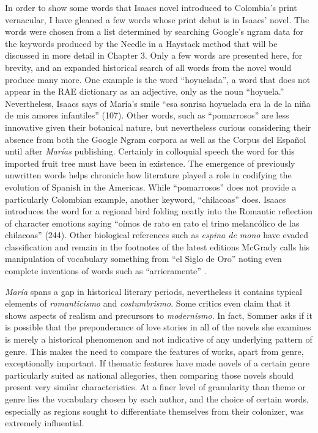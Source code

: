 \documentclass[12pt]{report}
\begin{document}
In order to show some words that Isaacs novel introduced to Colombia's print vernacular, I have gleaned a few words whose print debut is in Isaacs’ novel.
The words were chosen from a list determined by searching Google's ngram data for the keywords produced by the Needle in a Haystack method that will be discussed in more detail in Chapter 3.
Only a few words are presented here, for brevity, and an expanded historical search of all words from the novel would produce many more.
One example is the word \enquote{hoyuelada}, a word that does not appear in the RAE dictionary as an adjective, only as the noun \enquote{hoyuela.}
Nevertheless, Isaacs says of María’s smile \enquote{esa sonrisa hoyuelada era la de la niña de mis amores infantiles} (107).
Other words, such as \enquote{pomarrosos} are less innovative given their botanical nature, but nevertheless curious considering their absence from both the Google Ngram corpora as well as the Corpus del Español until after \textit{Marías} publishing.
Certainly in colloquial speech the word for this imported fruit tree must have been in existence.
The emergence of previously unwritten words helps chronicle how literature played a role in codifying the evolution of Spanish in the Americas.
While \enquote{pomarrosos} does not provide a particularly Colombian example, another keyword, \enquote{chilacoas} does.
Isaacs introduces the word for a regional bird folding neatly into the Romantic reflection of character emotions saying \enquote{oímos de rato en rato el trino melancólico de las chilacoas} (244).
Other biological references such as \textit{espina de mono} have evaded classification and remain in the footnotes of the latest editions
McGrady calls his manipulation of vocabulary something from \enquote{el Siglo de Oro} noting even complete inventions of words such as \enquote{arrieramente} \autocite[43]{McGrady2012}.


\textit{María} spans a gap in historical literary periods, nevertheless it contains typical elements of \textit{romanticismo} and \textit{costumbrismo}.
Some critics even claim that it shows aspects of realism and precursors to \textit{modernismo}.
In fact, Sommer asks if it is possible that the preponderance of love stories in all of the novels she examines is merely a historical phenomenon and not indicative of any underlying pattern of genre.
This makes the need to compare the features of works, apart from genre, exceptionally important.
If thematic features have made novels of a certain genre particularly suited as national allegories, then comparing those novels should present very similar characteristics.
At a finer level of granularity than theme or genre lies the vocabulary chosen by each author, and the choice of certain words, especially as regions sought to differentiate themselves from their colonizer, was extremely influential.
\end{document}
